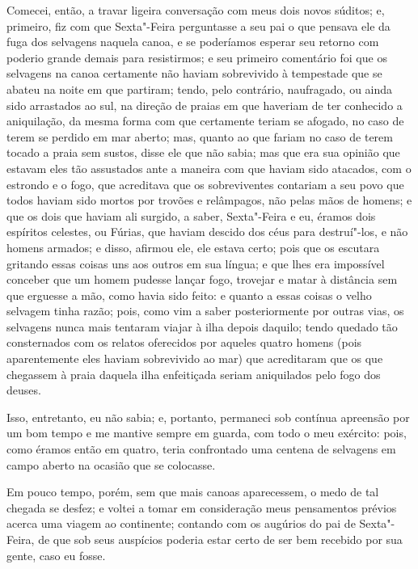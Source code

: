 Comecei, então, a travar ligeira conversação com meus dois novos
súditos; e, primeiro, fiz com que Sexta"-Feira perguntasse a seu pai o
que pensava ele da fuga dos selvagens naquela canoa, e se poderíamos
esperar seu retorno com poderio grande demais para resistirmos; e seu
primeiro comentário foi que os selvagens na canoa certamente não haviam
sobrevivido à tempestade que se abateu na noite em que partiram; tendo,
pelo contrário, naufragado, ou ainda sido arrastados ao sul, na direção
de praias em que haveriam de ter conhecido a aniquilação, da mesma forma
com que certamente teriam se afogado, no caso de terem se perdido em mar
aberto; mas, quanto ao que fariam no caso de terem tocado a praia sem
sustos, disse ele que não sabia; mas que era sua opinião que estavam
eles tão assustados ante a maneira com que haviam sido atacados, com o
estrondo e o fogo, que acreditava que os sobreviventes contariam a seu
povo que todos haviam sido mortos por trovões e relâmpagos, não pelas
mãos de homens; e que os dois que haviam ali surgido, a saber,
Sexta"-Feira e eu, éramos dois espíritos celestes, ou Fúrias, que haviam
descido dos céus para destruí"-los, e não homens armados; e disso,
afirmou ele, ele estava certo; pois que os escutara gritando essas
coisas uns aos outros em sua língua; e que lhes era impossível conceber
que um homem pudesse lançar fogo, trovejar e matar à distância sem que
erguesse a mão, como havia sido feito: e quanto a essas coisas o velho
selvagem tinha razão; pois, como vim a saber posteriormente por outras
vias, os selvagens nunca mais tentaram viajar à ilha depois daquilo;
tendo quedado tão consternados com os relatos oferecidos por aqueles
quatro homens (pois aparentemente eles haviam sobrevivido ao mar) que
acreditaram que os que chegassem à praia daquela ilha enfeitiçada seriam
aniquilados pelo fogo dos deuses.

Isso, entretanto, eu não sabia; e, portanto, permaneci sob contínua
apreensão por um bom tempo e me mantive sempre em guarda, com todo o meu
exército: pois, como éramos então em quatro, teria confrontado uma
centena de selvagens em campo aberto na ocasião que se colocasse.

Em pouco tempo, porém, sem que mais canoas aparecessem, o medo de tal
chegada se desfez; e voltei a tomar em consideração meus pensamentos
prévios acerca uma viagem ao continente; contando com os augúrios do pai
de Sexta"-Feira, de que sob seus auspícios poderia estar certo de ser bem
recebido por sua gente, caso eu fosse.

